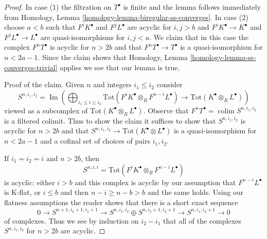 \documentclass[10pt,a4paper]{amsart}
\theoremstyle{plain}
\theoremstyle{definition}
\theoremstyle{remark}
\numberwithin{equation}{subsection}
\def\colim{\mathop{\mathrm{colim}}\nolimits}
\def\Im{\mathop{\mathrm{Im}}}
\begin{document}
\begin{proof}
In case (1) the filtration on $T^\bullet$ is finite and the lemma follows
immediately from
Homology, Lemma \ref{homology-lemma-biregular-ss-converges}.
In case (2) choose $a < b$ such that $F^iK^\bullet$ and $F^jL^\bullet$ are
acyclic for $i, j > b$ and $F^iK^\bullet \to K^\bullet$ and
$F^jL^\bullet \to L^\bullet$ are quasi-isomorphisms for $i, j < a$.
We claim that in this case the complex $F^nT^\bullet$ is acyclic for
$n > 2b$ and that $F^nT^\bullet \to T^\bullet$ is a quasi-isomorphism
for $n < 2a - 1$. Since the claim shows that
Homology, Lemma \ref{homology-lemma-ss-converges-trivial}
applies we see that our lemma is true.

\medskip\noindent
Proof of the claim. Given $n$ and integers $i_1 \leq i_2$ consider
$$
S^{n, i_1, i_2} =
\Im\left(
\bigoplus\nolimits_{i_1 \leq i \leq i_2}
\text{Tot}(F^iK^\bullet \otimes_R F^{n - i}L^\bullet)
\to
\text{Tot}(K^\bullet \otimes_R L^\bullet)
\right)
$$
viewed as a subcomplex of $\text{Tot}(K^\bullet \otimes_R L^\bullet)$.
Observe that $F^nT^\bullet = \colim S^{n, i_1, i_2}$ is a filtered colimit.
Thus to show the claim it suffices to show that $S^{n, i_1, i_2}$ is acyclic
for $n > 2b$ and that
$S^{n, i_1, i_2} \to \text{Tot}(K^\bullet \otimes L^\bullet)$
is a quasi-isomorphism for $n < 2a - 1$ and a cofinal set of choices of
pairs $i_1, i_2$.

\medskip\noindent
If $i_1 = i_2 = i$ and $n > 2b$, then
$$
S^{n, i, i} =
\text{Tot}(F^iK^\bullet \otimes_R F^{n - i}L^\bullet)
$$
is acyclic: either $i > b$ and this complex is acyclic by 
our assumption that $F^{n - i}L^\bullet$ is K-flat, or
$i \leq b$ and then $n - i \geq n - b > b$ and the same holds.
Using our flatness assumptions the reader shows that there is a short
exact sequence
$$
0 \to
S^{n + 1, i_2 + 1, i_2 + 1}
\to
S^{n, i_1, i_2} \oplus S^{n, i_2 + 1, i_2 + 1}
\to
S^{n, i_1, i_2 + 1}
\to
0
$$
of complexes. Thus we see by induction on $i_2 - i_1$ that all of the complexes
$S^{n, i_1, i_2}$ for $n > 2b$ are acyclic.


\end{proof}
\end{document}
